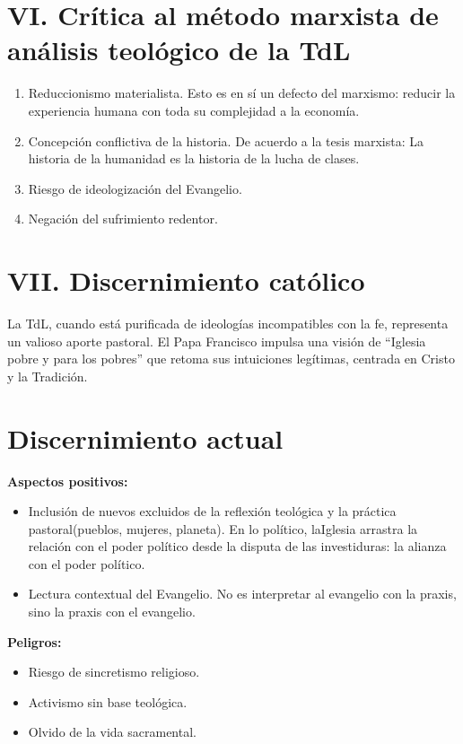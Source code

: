 \documentclass[12pt]{article}
\begin{document}
\section*{VI. Crítica al método marxista de análisis teológico de la TdL}

\begin{enumerate}
    \item Reduccionismo materialista. Esto es en sí un defecto del marxismo: reducir la experiencia humana con toda su complejidad a la economía.
    \item Concepción conflictiva de la historia. De acuerdo a la tesis marxista: La historia de la humanidad es la historia de la lucha de clases.
    \item Riesgo de ideologización del Evangelio.
    \item Negación del sufrimiento redentor.
\end{enumerate}

\section*{VII. Discernimiento católico}

La TdL, cuando está purificada de ideologías incompatibles con la fe, representa un valioso aporte pastoral. El Papa Francisco impulsa una visión de ``Iglesia pobre y para los pobres'' que retoma sus intuiciones legítimas, centrada en Cristo y la Tradición.

\section*{Discernimiento actual}

\textbf{Aspectos positivos:}
\begin{itemize}
    \item Inclusión de nuevos excluidos de la reflexión teológica y la práctica pastoral(pueblos, mujeres, planeta). En lo político, laIglesia arrastra la relación con el poder político desde la disputa de las investiduras: la alianza con el poder político.
    \item Lectura contextual del Evangelio. No es interpretar al evangelio con la praxis, sino la praxis con el evangelio.
\end{itemize}

\textbf{Peligros:}
\begin{itemize}
    \item Riesgo de sincretismo religioso.
    \item Activismo sin base teológica.
    \item Olvido de la vida sacramental.
\end{itemize}
\end{document}
